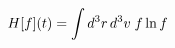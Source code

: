 \documentclass[preview]{standalone}
\begin{document}
\begin{align*}
\special{dvisvgm:raw <g id='unique000'>}H[f](t)=\int d^3r\,d^3v\;f\ln f\special{dvisvgm:raw </g>}
\end{align*}
\end{document}
